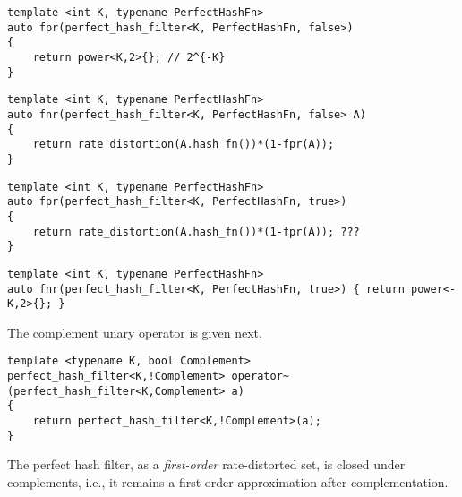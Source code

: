 \documentclass[ ../main.tex]{subfiles}
\begin{document}
\begin{verbatim}
template <int K, typename PerfectHashFn>
auto fpr(perfect_hash_filter<K, PerfectHashFn, false>)
{
	return power<K,2>{}; // 2^{-K}
}
\end{verbatim}

\begin{verbatim}
template <int K, typename PerfectHashFn>
auto fnr(perfect_hash_filter<K, PerfectHashFn, false> A)
{
	return rate_distortion(A.hash_fn())*(1-fpr(A));
}
\end{verbatim}

\begin{verbatim}
template <int K, typename PerfectHashFn>
auto fpr(perfect_hash_filter<K, PerfectHashFn, true>)
{
	return rate_distortion(A.hash_fn())*(1-fpr(A)); ???
}
\end{verbatim}

\begin{verbatim}
template <int K, typename PerfectHashFn>
auto fnr(perfect_hash_filter<K, PerfectHashFn, true>) { return power<-K,2>{}; }
\end{verbatim}

The complement unary operator is given next.
\begin{verbatim}
template <typename K, bool Complement>
perfect_hash_filter<K,!Complement> operator~(perfect_hash_filter<K,Complement> a)
{
	return perfect_hash_filter<K,!Complement>(a);
}
\end{verbatim}

The perfect hash filter, as a \emph{first-order} rate-distorted set, is closed under complements, i.e., it remains a first-order approximation after complementation.
\end{document}

